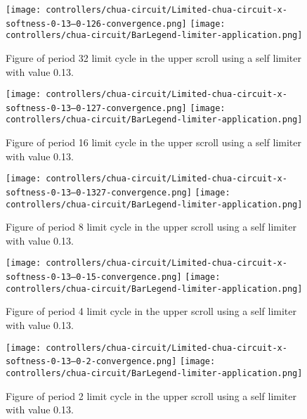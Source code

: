 \documentclass[main]{subfiles}
\begin{document}
\begin{figure}[H]
\centering
\texttt{[image: controllers/chua-circuit/Limited-chua-circuit-x-softness-0-13--0-126-convergence.png]}
\texttt{[image: controllers/chua-circuit/BarLegend-limiter-application.png]}
\caption[Figure of period 32 limit cycle using a 0.13 soft limiter.]{Figure of period 32 limit cycle in the upper scroll using a self limiter with value 0.13.}
\label{figure:x-0.13-32-limit-cycle-upperscroll-trajectory}
\end{figure}

\begin{figure}[H]
\centering
\texttt{[image: controllers/chua-circuit/Limited-chua-circuit-x-softness-0-13--0-127-convergence.png]}
\texttt{[image: controllers/chua-circuit/BarLegend-limiter-application.png]}
\caption[Figure of period 16 limit cycle using a 0.13 soft limiter]{Figure of period 16 limit cycle in the upper scroll using a self limiter with value 0.13.}
\label{figure:x-0.13-16-limit-cycle-upperscroll-trajectory}
\end{figure}

\begin{figure}[H]
\centering
\texttt{[image: controllers/chua-circuit/Limited-chua-circuit-x-softness-0-13--0-1327-convergence.png]}
\texttt{[image: controllers/chua-circuit/BarLegend-limiter-application.png]}
\caption[Figure of period 8 limit cycle using a 0.13 soft limiter]{Figure of period 8 limit cycle in the upper scroll using a self limiter with value 0.13.}
\label{figure:x-0.13-8-limit-cycle-upperscroll-trajectory}
\end{figure}

\begin{figure}[H]
\centering
\texttt{[image: controllers/chua-circuit/Limited-chua-circuit-x-softness-0-13--0-15-convergence.png]}
\texttt{[image: controllers/chua-circuit/BarLegend-limiter-application.png]}
\caption[Figure of period 4 limit cycle using a 0.13 soft limiter]{Figure of period 4 limit cycle in the upper scroll using a self limiter with value 0.13.}
\label{figure:x-0.13-4-limit-cycle-upperscroll-trajectory}
\end{figure}

\begin{figure}[H]
\centering
\texttt{[image: controllers/chua-circuit/Limited-chua-circuit-x-softness-0-13--0-2-convergence.png]}
\texttt{[image: controllers/chua-circuit/BarLegend-limiter-application.png]}
\caption[Figure of period 3 limit cycle using a 0.13 soft limiter]{Figure of period 2 limit cycle in the upper scroll using a self limiter with value 0.13.}
\label{figure:x-0.13-2-limit-cycle-upperscroll-trajectory}
\end{figure}
\end{document}
